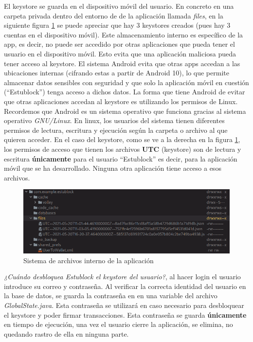El keystore se guarda en el dispositivo móvil del usuario. En concreto en una carpeta privada dentro del entorno de de la aplicación llamada \emph{files}, en la siguiente figura \ref{fig:fileSystem} se puede apreciar que hay 3 keystores creados (pues hay 3 cuentas en el dispositivo móvil). Este almacenamiento interno es específico de la app, es decir, no puede ser accedido por otras aplicaciones que pueda tener el usuario en el dispositivo móvil. Esto evita que una aplicación maliciosa pueda tener acceso al keystore. El sistema Android evita que otras apps accedan a las ubicaciones internas (cifrando estas a partir de Android 10), lo que permite almacenar datos sensibles con seguridad y que solo la aplicación móvil en cuestión (``Estublock'') tenga acceso a dichos datos. La forma que tiene Android de evitar que otras aplicaciones accedan al keystore es utilizando los permisos de Linux. Recordemos que Android es un sistema operativo que funciona gracias al sistema operativo \emph{GNU/Linux}\cite{linux}. En linux, los usuarios del sistema tienen diferentes permisos de lectura, escritura y ejecución según la carpeta o archivo al que quieren acceder\cite{usuariosLinux}. En el caso del keystore, como se ve a la derecha en la figura \ref{fig:fileSystem}, los permisos de acceso que tienen los archivos \textbf{UTC} (keystore) son de lectura y escritura \textbf{únicamente} para el usuario ``Estublock'' es decir, para la aplicación móvil que se ha desarrollado. Ninguna otra aplicación tiene acceso a esos archivos. \\

\begin{figure}[h!]
  \centering
  \includegraphics[width=1\linewidth]{figs/Desarrollo/Keystore/fileSystem}
  \caption[Sistema de archivos interno de la aplicación]{Sistema de archivos interno de la aplicación}
  \label{fig:fileSystem}
\end{figure}

\emph{¿Cuándo desbloquea Estublock el keystore del usuario?}, al hacer login el usuario introduce su correo y contraseña. Al verificar la correcta identidad del usuario en la base de datos, se guarda la contraseña en en una variable del archivo \emph{GlobalState.java}. Esta contraseña se utilizará en caso necesario para desbloquear el keystore y poder firmar transacciones. Esta contraseña se guarda \textbf{únicamente} en tiempo de ejecución, una vez el usuario cierre la aplicación, se elimina, no quedando rastro de ella en ninguna parte. \\


